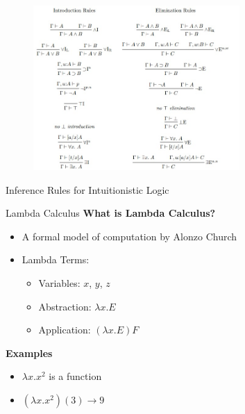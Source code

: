 \documentclass[aspectratio=169, 12pt]{beamer}
\begin{document}
\begin{frame}
    \begin{figure}[h]
  \centering
  \includegraphics[width=0.7\textwidth]{nid.jpeg}

\end{figure}
Inference Rules for Intuitionistic Logic
\end{frame}
\begin{frame}{Lambda Calculus}
\textbf{What is Lambda Calculus?}
\begin{itemize}
  \item A formal model of computation by Alonzo Church
  \item Lambda Terms:
    \begin{itemize}
        \item Variables: $x$, $y$, $z$
        \item Abstraction: $\lambda x.E$
        \item Application: $(\lambda x.E)F$
    \end{itemize}
\end{itemize}
\end{frame}
\begin{frame}
\textbf{Examples}
\begin{itemize}
    \item $\lambda x.x^2$ is a function
    \item $(\lambda x.x^2)(3) \rightarrow 9$
\end{itemize}

\end{frame}
\end{document}
